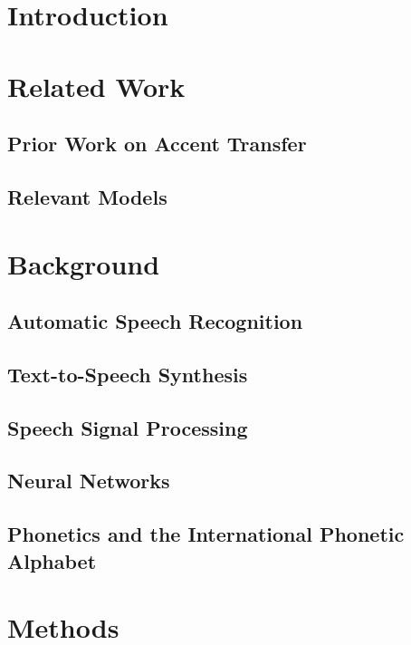 


\section{Introduction} %
  
\section{Related Work} %
  \subsection{Prior Work on Accent Transfer} %
      
  \subsection{Relevant Models} %
      
      \newpage
\section{Background} %
    \subsection{Automatic Speech Recognition} %
        
    \subsection{Text-to-Speech Synthesis} %
        
    \subsection{Speech Signal Processing} %
        
    \subsection{Neural Networks} %
        
    \subsection{Phonetics and the International Phonetic Alphabet} %
        
        \newpage
\section{Methods} %
